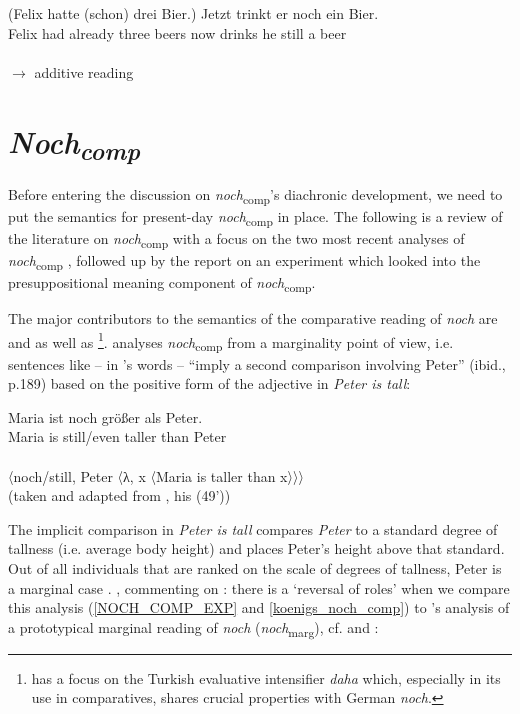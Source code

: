 \documentclass[output=paper,
modfonts
]{langscibook}
\begin{document}
\ea\gll (Felix hatte (schon) drei Bier.) Jetzt trinkt er noch ein Bier.\\
       Felix had already three beers now drinks he still a beer\\
 \\ \hfill $\rightarrow$ additive reading \label{NOCH_ADD_EXP}
\z

\section{\textit{Noch\textsubscript{comp}}}\label{sec_noch-comp_gen}

Before entering the discussion on \textit{noch}\textsubscript{comp}'s diachronic development, we need to put the semantics for present-day \textit{noch}\textsubscript{comp} in place. The following is a review of the literature on \textit{noch}\textsubscript{comp} with a focus on the two most recent analyses of \textit{noch}\textsubscript{comp} \citep{umbach2009a_comp,Hofstetter2013}, followed up by the report on an experiment which looked into the presuppositional meaning component of \textit{noch}\textsubscript{comp}.

The major contributors to the semantics of the comparative reading of \textit{noch} are \citet{koenig1977} and \citet{umbach2009a_comp} as well as \citet{Hofstetter2013}\footnote{ \citet{Hofstetter2013} has a focus on the Turkish evaluative intensifier \textit{daha} which, especially in its use in comparatives, shares crucial properties with German \textit{noch}.}. \citet{koenig1977} analyses \textit{noch}\textsubscript{comp} from a marginality point of view, i.e. sentences like  -- in \citeauthor{koenig1977}'s words -- ``imply a second comparison involving Peter'' (ibid., p.189) based on the positive form of the adjective in \textit{Peter is tall}:

\ea\gll Maria ist noch größer als Peter.\\
       Maria is still/even taller than Peter\\
 \label{NOCH_COMP_EXP}\\
\z
\ea 〈{noch}/{still}, Peter 〈λ, x 〈Maria is taller than x〉〉〉 \label{koenigs_noch_comp} \\ (taken and adapted from \citet{koenig1977}, his (49')) \z

The implicit comparison in \textit{Peter is tall} compares \textit{Peter} to a standard degree of tallness (i.e. average body height) and places Peter's height above that standard. Out of all individuals that are ranked on the scale of degrees of tallness, Peter is a marginal case \citep{koenig1977}. \citet{umbach2009a_comp}, commenting on \citet{koenig1977}: there is a `reversal of roles' when we compare this analysis (\ref{NOCH_COMP_EXP} and \ref{koenigs_noch_comp}) to \citeauthor{koenig1977}'s analysis of a prototypical marginal reading of \textit{noch} (\textit{noch}\textsubscript{marg}), cf.  and :
\end{document}
